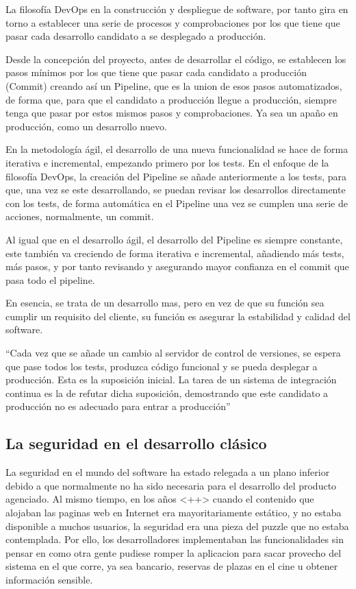 \documentclass[12pt]{report} %
\begin{document}
La filosofía DevOps en la construcción y despliegue de software, por tanto gira en torno a establecer una serie de procesos y comprobaciones por los que tiene que pasar cada desarrollo candidato a se desplegado a producción. 

Desde la concepción del proyecto, antes de desarrollar el código, se establecen los pasos mínimos por los que tiene que pasar cada candidato a producción (Commit) creando así un Pipeline, que es la union de esos pasos automatizados, de forma que, para que el candidato a producción llegue a producción, siempre tenga que pasar por estos mismos pasos y comprobaciones.
Ya sea un apaño en producción, como un desarrollo nuevo.

En la metodología ágil, el desarrollo de una nueva funcionalidad se hace de forma iterativa e incremental, empezando primero por los tests.
En el enfoque de la filosofía DevOps, la creación del Pipeline se añade anteriormente a los tests, para que, una vez se este desarrollando, se puedan revisar los desarrollos directamente con los tests, de forma automática en el Pipeline una vez se cumplen una serie de acciones, normalmente, un commit.

Al igual que en el desarrollo ágil, el desarrollo del Pipeline es siempre constante, este también va creciendo de forma iterativa e incremental, añadiendo más tests, más pasos, y por tanto revisando y asegurando mayor confianza en el commit que pasa todo el pipeline.

En esencia, se trata de un desarrollo mas, pero en vez de que su función sea cumplir un requisito del cliente, su función es asegurar la estabilidad y calidad del software. 

``Cada vez que se añade un cambio al servidor de control de versiones, se espera que pase todos los tests, produzca código funcional y se pueda desplegar a producción.
Esta es la suposición inicial.
La tarea de un sistema de integración continua es la de refutar dicha suposición, demostrando que este candidato a producción no es adecuado para entrar a producción''\cite{Humble2010}


\subsection{La seguridad en el desarrollo clásico}
 
La seguridad en el mundo del software ha estado relegada a un plano inferior debido a que normalmente no ha sido necesaria para el desarrollo del producto agenciado.
Al mismo tiempo, en los años <++> cuando el contenido que alojaban las paginas web en Internet era mayoritariamente estático, y no estaba disponible a muchos usuarios, la seguridad era una pieza del puzzle que no estaba contemplada.
Por ello, los desarrolladores implementaban las funcionalidades sin pensar en como otra gente pudiese romper la aplicacion para sacar provecho del sistema en el que corre, ya sea bancario, reservas de plazas en el cine u obtener información sensible.
\end{document}
